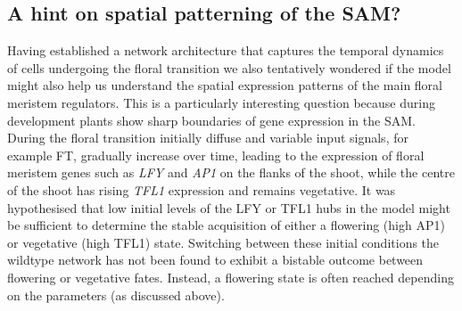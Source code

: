 \subsection{A hint on spatial patterning of the SAM?}

Having established a network architecture that captures the temporal dynamics of cells undergoing the floral transition we also tentatively wondered if the model might also help us understand the spatial expression patterns of the main floral meristem regulators.
This is a particularly interesting question because during development plants show sharp boundaries of gene expression in the SAM.
During the floral transition initially diffuse and variable input signals, for example FT, gradually increase over time, leading to the expression of floral meristem genes such as \emph{LFY} and \emph{AP1} on the flanks of the shoot, while the centre of the shoot has rising \emph{TFL1} expression and remains vegetative.
It was hypothesised that low initial levels of the LFY or TFL1 hubs in the model might be sufficient to determine the stable acquisition of either a flowering (high AP1) or vegetative (high TFL1) state.
Switching between these initial conditions the wildtype network has not been found to exhibit a bistable outcome between flowering or vegetative fates.
Instead, a flowering state is often reached depending on the parameters (as discussed above).

